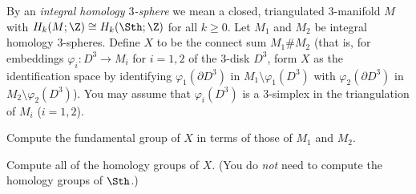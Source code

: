 By an \emph{integral homology $3$-sphere} we mean a closed,
triangulated $3$-manifold $M$ with $H_k(M;\Z)\cong H_k(\Sth;\Z)$ for
all $k\geq 0$. Let $M_1$ and $M_2$ be integral homology
$3$-spheres. Define $X$ to be the connect sum $M_1\#M_2$ (that is, for
embeddings $\varphi_i:D^3\rightarrow M_i$ for $i=1,2$ of the $3$-disk
$D^3$, form $X$ as the identification space by identifying
$\varphi_1(\partial D^3)$ in $M_1\setminus \varphi_1(D^3)$ with
$\varphi_2(\partial D^3)$ in $M_2\setminus \varphi_2(D^3)$). You may
assume that $\varphi_i(D^3)$ is a $3$-simplex in the triangulation of
$M_i$ ($i=1,2$).
\begin{alist}
\item Compute the fundamental group of $X$ in terms of those of $M_1$
and $M_2$.
\item Compute all of the homology groups of $X$. (You do \emph{not}
need to compute the homology groups of $\Sth$.)
\end{alist}

